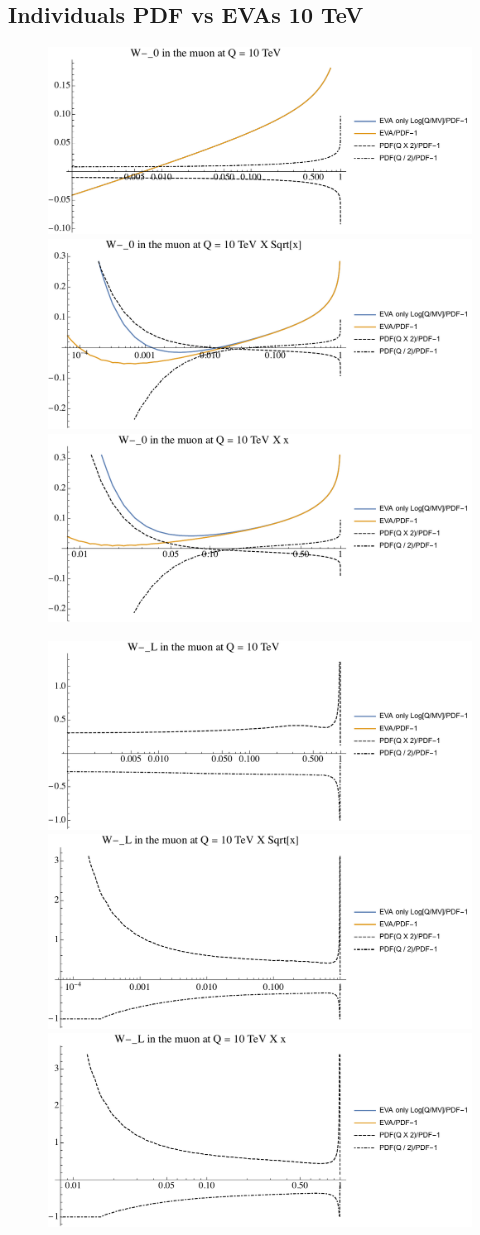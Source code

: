 \documentclass[a4paper,11pt]{article}
\begin{document}
\clearpage
\subsection{Individuals PDF vs EVAs 10 TeV}

\begin{figure}[ht]
\includegraphics[width=0.46\linewidth]{PlotPDFs/ratios/10TeV/W-_0_Q.pdf}
\includegraphics[width=0.46\linewidth]{PlotPDFs/ratios/10TeV/W-_0_Qsqrtx.pdf}
\includegraphics[width=0.46\linewidth]{PlotPDFs/ratios/10TeV/W-_0_Qx.pdf}
\end{figure}

\begin{figure}[ht]
\includegraphics[width=0.46\linewidth]{PlotPDFs/ratios/10TeV/W-_L_Q.pdf}
\includegraphics[width=0.46\linewidth]{PlotPDFs/ratios/10TeV/W-_L_Qsqrtx.pdf}
\includegraphics[width=0.46\linewidth]{PlotPDFs/ratios/10TeV/W-_L_Qx.pdf}
\end{figure}
\end{document}

